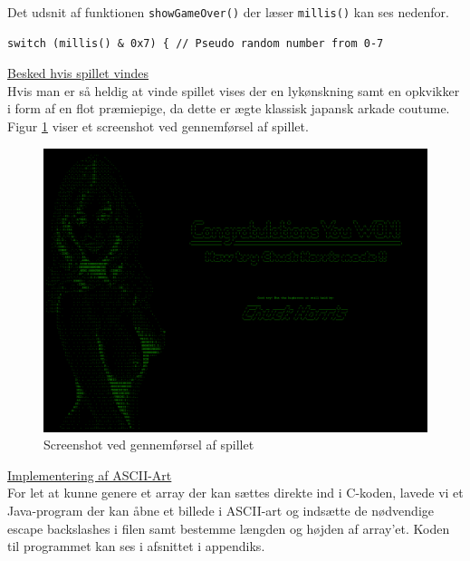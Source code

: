 Det udsnit af funktionen \texttt{showGameOver()} der læser \texttt{millis()} kan ses nedenfor.

\begin{lstlisting}[frame=single,firstnumber=6]
switch (millis() & 0x7) { // Pseudo random number from 0-7
\end{lstlisting}

\underline{Besked hvis spillet vindes}\\

Hvis man er så heldig at vinde spillet vises der en lykønskning samt en opkvikker i form af en flot præmiepige, da dette er ægte klassisk japansk arkade coutume.\\

Figur \ref{fig:won_normal} viser et screenshot ved gennemførsel af spillet.\\

\begin{figure}[h!]
\centering
\includegraphics[scale=0.25]{figs/screenshots/won_normal.png}
\caption{Screenshot ved gennemførsel af spillet}
\label{fig:won_normal}
\end{figure}

\underline{Implementering af ASCII-Art}\\

For let at kunne genere et array der kan sættes direkte ind i C-koden, lavede vi et Java-program der kan åbne et billede i ASCII-art og indsætte de nødvendige escape backslashes i filen samt bestemme længden og højden af array'et. Koden til programmet kan ses i afsnittet  i appendiks.
\newpage

